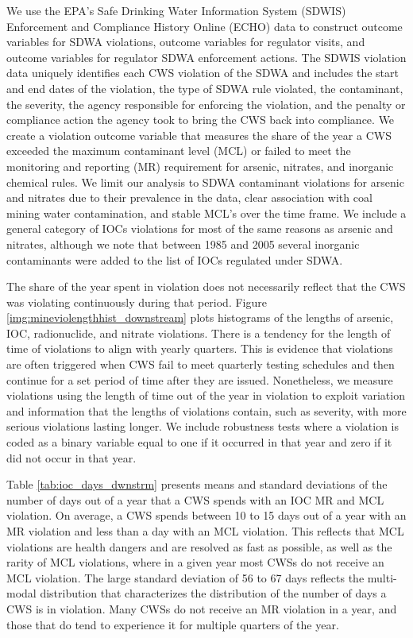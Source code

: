 \documentclass{article}
\begin{document}
We use the EPA's Safe Drinking Water Information System (SDWIS) Enforcement and Compliance History Online (ECHO) data to construct outcome variables for SDWA violations, outcome variables for regulator visits, and outcome variables for regulator SDWA enforcement actions. The SDWIS violation data uniquely identifies each CWS violation of the SDWA and includes the start and end dates of the violation, the type of SDWA rule violated, the contaminant, the severity, the agency responsible for enforcing the violation, and the penalty or compliance action the agency took to bring the CWS back into compliance. We create a violation outcome variable that measures the share of the year a CWS exceeded the maximum contaminant level (MCL) or failed to meet the monitoring and reporting (MR) requirement for arsenic, nitrates, and inorganic chemical rules. We limit our analysis to SDWA contaminant violations for arsenic and nitrates due to their prevalence in the data, clear association with coal mining water contamination, and stable MCL's over the time frame. We include a general category of IOCs violations for most of the same reasons as arsenic and nitrates, although we note that between 1985 and 2005 several inorganic contaminants were added to the list of IOCs regulated under SDWA.

The share of the year spent in violation does not necessarily reflect that the CWS was violating continuously during that period. Figure \ref{img:mineviolengthhist_downstream} plots histograms of the lengths of arsenic, IOC, radionuclide, and nitrate violations. There is a tendency for the length of time of violations to align with yearly quarters. This is evidence that violations are often triggered when CWS fail to meet quarterly testing schedules and then continue for a set period of time after they are issued. Nonetheless, we measure violations using the length of time out of the year in violation to exploit variation and information that the lengths of violations contain, such as severity, with more serious violations lasting longer. We include robustness tests where a violation is coded as a binary variable equal to one if it occurred in that year and zero if it did not occur in that year.

Table \ref{tab:ioc_days_dwnstrm} presents means and standard deviations of the number of days out of a year that a CWS spends with an IOC MR and MCL violation. On average, a CWS spends between 10 to 15 days out of a year with an MR violation and less than a day with an MCL violation. This reflects that MCL violations are health dangers and are resolved as fast as possible, as well as the rarity of MCL violations, where in a given year most CWSs do not receive an MCL violation. The large standard deviation of 56 to 67 days reflects the multi-modal distribution that characterizes the distribution of the number of days a CWS is in violation. Many CWSs do not receive an MR violation in a year, and those that do tend to experience it for multiple quarters of the year. 
\end{document}
